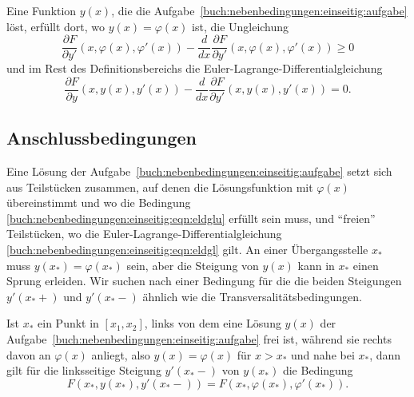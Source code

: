 \begin{satz}
\label{buch:nebenbedingungen:einseitig:satz:elungleichung}
Eine Funktion $y(x)$, die die
Aufgabe~\ref{buch:nebenbedingungen:einseitig:aufgabe}
löst, erfüllt dort, wo $y(x)=\varphi(x)$ ist, die Ungleichung
%
%
\begin{equation}
\frac{\partial F}{\partial y'}(x,\varphi(x),\varphi'(x))
-
\frac{d}{dx}\frac{\partial F}{\partial y'}(x,\varphi(x),\varphi'(x))
\ge
0
\label{buch:nebenbedingungen:einseitig:eqn:eldglu}
\end{equation}
und im Rest des Definitionsbereichs die Euler-Lagrange-Differentialgleichung
\begin{equation}
\frac{\partial F}{\partial y}(x,y(x),y'(x))
-
\frac{d}{dx}
\frac{\partial F}{\partial y'}(x,y(x),y'(x))
=
0.
\label{buch:nebenbedingungen:einseitig:eqn:eldgl}
\end{equation}
\end{satz}

%
%
\subsection{Anschlussbedingungen
\label{buch:nebenbedingungen:einseitig:subsection:anschluss}}

Eine Lösung der
Aufgabe~\ref{buch:nebenbedingungen:einseitig:aufgabe}
setzt sich aus Teilstücken zusammen, auf denen die Lösungsfunktion mit
$\varphi(x)$ übereinstimmt und wo die Bedingung
\eqref{buch:nebenbedingungen:einseitig:eqn:eldglu}
erfüllt sein muss, und ``freien'' Teilstücken, wo die
Euler-Lagrange-Differentialgleichung
\eqref{buch:nebenbedingungen:einseitig:eqn:eldgl} gilt.
An einer Übergangsstelle $x_*$ muss $y(x_*)=\varphi(x_*)$ sein,
aber die Steigung von $y(x)$ kann in $x_*$ einen Sprung
erleiden.
Wir suchen nach einer Bedingung für die die beiden Steigungen 
$y'(x_*+)$ und $y'(x_*-)$ ähnlich wie die Transversalitätsbedingungen.
%

\begin{satz}[Anschlussbedingungen]
\label{buch:nebenbedingungen:einseitig:satz:anschlussbedingungen}
Ist $x_*$ ein Punkt in $[x_1,x_2]$, links von dem eine Lösung $y(x)$ der
Aufgabe~\ref{buch:nebenbedingungen:einseitig:aufgabe}
frei ist, während sie rechts davon an $\varphi(x)$ anliegt, also
$y(x) = \varphi(x)$ für $x>x_*$ und nahe bei $x_*$, dann gilt
für die linksseitige Steigung $y'(x_*-)$ von $y(x_*)$ die
Bedingung
\[
F(x_*,y(x_*),y'(x_*-)) = F(x_*,\varphi(x_*),\varphi'(x_*)).
\]
\end{satz}

